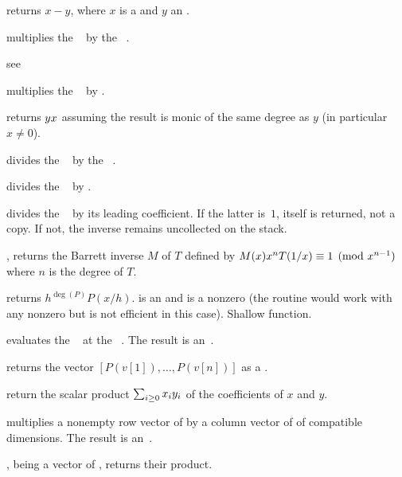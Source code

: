  returns $x - y$, where $x$ is
a  and $y$ an .

 multiplies the ~
by the ~.

 see 

 multiplies the ~
by .

 returns $y\*x$ assuming the
result is monic of the same degree as $y$ (in particular $x\neq 0$).

 divides the ~
by the ~.

 divides the ~
by .


 divides the ~ by its
leading coefficient. If the latter is~$1$,  itself is returned, not a
copy. If not, the inverse remains uncollected on the stack.

, returns the Barrett inverse
$M$ of $T$ defined by $M(x)\*x^n\*T(1/x)\equiv 1\pmod{x^{n-1}}$ where $n$ is
the degree of $T$.

 returns $h^{\deg(P)} P(x/h)$.
 is an  and  is a nonzero  (the routine would
work with any nonzero  but is not efficient in this case).
Shallow function.

 evaluates the ~
at the ~. The result is an~.

 returns the vector
$[P(v[1]),\ldots,P(v[n])]$ as a .

 return the scalar product
$\sum_{i\geq 0} x_i\*y_i$ of the coefficients of $x$ and $y$.

 multiplies a nonempty row
vector of  by a column vector of  of compatible dimensions.
The result is an~.

,  being a vector of ,
returns their product.

